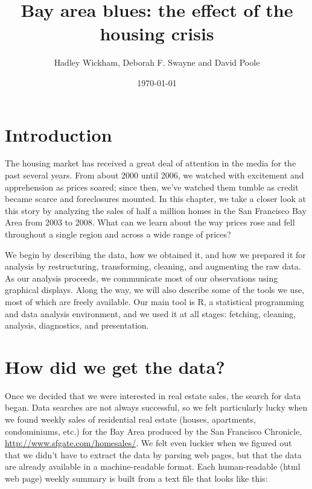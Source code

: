 \documentclass[oneside]{article}
\title{Bay area blues: the effect of the housing crisis}
\author{Hadley Wickham, Deborah F. Swayne and David Poole}
\date{\today}
\begin{document}
\maketitle 

\section{Introduction}

The housing market has received a great deal of attention in the media for the past several years.  From about 2000 until 2006, we watched with excitement and apprehension as prices soared; since then, we've watched them tumble as credit became scarce and foreclosures mounted.   In this chapter, we take a closer look at this story by analyzing the sales of half a million homes in the San Francisco Bay Area from 2003 to 2008.  What can we learn about the way prices rose and fell throughout a single region and across a wide range of prices?


We begin by describing the data, how we obtained it, and how we prepared it for analysis by restructuring, transforming, cleaning, and augmenting the raw data.  As our analysis proceeds, we communicate most of our observations using graphical displays.  Along the way, we will also describe some of the tools we use, most of which are freely available.   Our main tool is R, a statistical programming and data analysis environment, and we used it at all stages: fetching, cleaning, analysis, diagnostics, and presentation.

%

\section{How did we get the data?}


Once we decided that we were interested in real estate sales, the search for data began.  Data searches are not always successful, so we felt particularly lucky when we found weekly sales of residential real estate (houses, apartments, condominiums, etc.) for the Bay Area produced by the San Francisco Chronicle, \url{http://www.sfgate.com/homesales/}.  We felt even luckier when we figured out that we didn't have to extract the data by parsing web pages, but that the data are already available in a machine-readable format.  Each human-readable (html web page) weekly summary is built from a text file that looks like this: 
\end{document}
